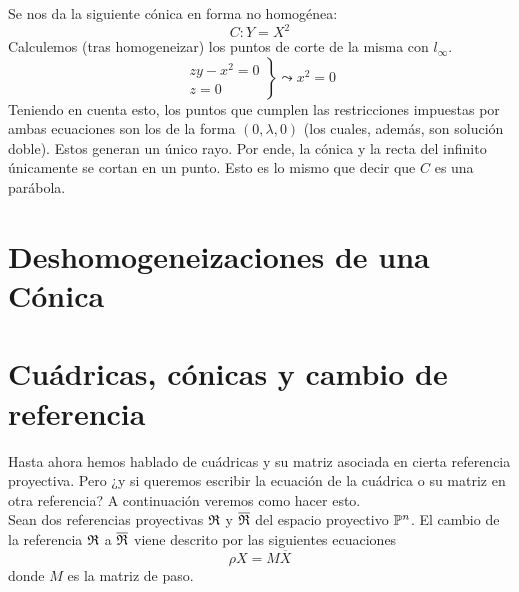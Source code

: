\begin{exa}[Parábola]
	Se nos da la siguiente cónica en forma no homogénea:
	\[C:Y=X^2\]
	Calculemos (tras homogeneizar) los puntos de corte de la misma con $l_\infty$.
	\[\left.\begin{array}{c}
	zy-x^2=0\\
	z=0
	\end{array}\right\}\leadsto x^2=0\]
	Teniendo en cuenta esto, los puntos que cumplen las restricciones impuestas por ambas ecuaciones son los de la forma $(0,\lambda,0)$ (los cuales, además, son solución doble). Estos generan un único rayo. Por ende, la cónica y la recta del infinito únicamente se cortan en un punto. Esto es lo mismo que decir que $C$ es una parábola.
\end{exa}
\section{Deshomogeneizaciones de una Cónica}

\section{Cuádricas, cónicas y cambio de referencia}
Hasta ahora hemos hablado de cuádricas y su matriz asociada en cierta referencia proyectiva. Pero ¿y si queremos escribir la ecuación de la cuádrica o su matriz en otra referencia? A continuación veremos como hacer esto.\\

Sean dos referencias proyectivas $\mathfrak{R}$ y $\overline{\mathfrak{R}}$ del espacio proyectivo $\mathbb{P}^n$. El cambio de la referencia $\mathfrak{R}$ a $\overline{\mathfrak{R}}$ viene descrito por las siguientes ecuaciones
\begin{equation}
\rho X=M\overline{X}
\end{equation}
donde $M$ es la matriz de paso. 

